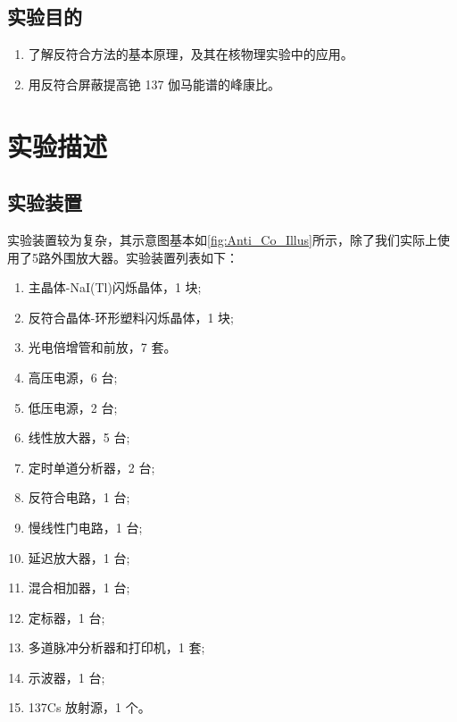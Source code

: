 \documentclass{article}
\begin{document}
\subsection{实验目的}
\begin{enumerate}
    \item 了解反符合方法的基本原理，及其在核物理实验中的应用。
    \item 用反符合屏蔽提高铯 137 伽马能谱的峰康比。
\end{enumerate}
\section{实验描述}
\subsection{实验装置}
实验装置较为复杂，其示意图基本如\ref{fig:Anti_Co_Illus}所示，除了我们实际上使用了5路外围放大器。实验装置列表如下：
\begin{enumerate}
    \item 主晶体-NaI(Tl)闪烁晶体，1 块; 
    \item 反符合晶体-环形塑料闪烁晶体，1 块; 
    \item 光电倍增管和前放，7 套。
    \item 高压电源，6 台; 
    \item 低压电源，2 台; 
    \item 线性放大器，5 台; 
    \item 定时单道分析器，2 台; 
    \item 反符合电路，1 台; 
    \item 慢线性门电路，1 台; 
    \item 延迟放大器，1 台; 
    \item 混合相加器，1 台;
    \item 定标器，1 台; 
    \item 多道脉冲分析器和打印机，1 套; 
    \item 示波器，1 台;
    \item 137Cs 放射源，1 个。
\end{enumerate}
\end{document}
